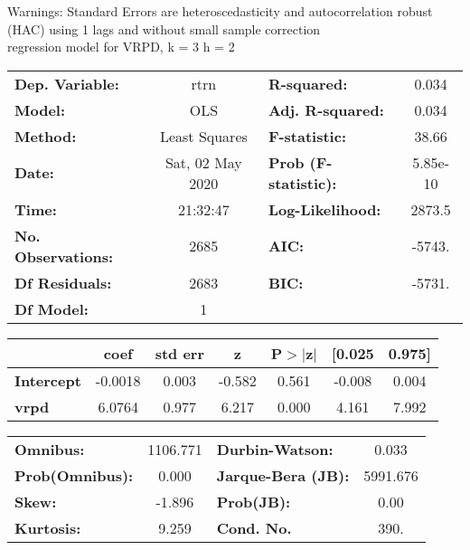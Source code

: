 Warnings: \newline
 [1] Standard Errors are heteroscedasticity and autocorrelation robust (HAC) using 1 lags and without small sample correction\\ 

regression model for VRPD, k = 3 h = 2\begin{center}
\begin{tabular}{lclc}
\toprule
\textbf{Dep. Variable:}    &       rtrn       & \textbf{  R-squared:         } &     0.034   \\
\textbf{Model:}            &       OLS        & \textbf{  Adj. R-squared:    } &     0.034   \\
\textbf{Method:}           &  Least Squares   & \textbf{  F-statistic:       } &     38.66   \\
\textbf{Date:}             & Sat, 02 May 2020 & \textbf{  Prob (F-statistic):} &  5.85e-10   \\
\textbf{Time:}             &     21:32:47     & \textbf{  Log-Likelihood:    } &    2873.5   \\
\textbf{No. Observations:} &        2685      & \textbf{  AIC:               } &    -5743.   \\
\textbf{Df Residuals:}     &        2683      & \textbf{  BIC:               } &    -5731.   \\
\textbf{Df Model:}         &           1      & \textbf{                     } &             \\
\bottomrule
\end{tabular}
\begin{tabular}{lcccccc}
                   & \textbf{coef} & \textbf{std err} & \textbf{z} & \textbf{P$> |$z$|$} & \textbf{[0.025} & \textbf{0.975]}  \\
\midrule
\textbf{Intercept} &      -0.0018  &        0.003     &    -0.582  &         0.561        &       -0.008    &        0.004     \\
\textbf{vrpd}      &       6.0764  &        0.977     &     6.217  &         0.000        &        4.161    &        7.992     \\
\bottomrule
\end{tabular}
\begin{tabular}{lclc}
\textbf{Omnibus:}       & 1106.771 & \textbf{  Durbin-Watson:     } &    0.033  \\
\textbf{Prob(Omnibus):} &   0.000  & \textbf{  Jarque-Bera (JB):  } & 5991.676  \\
\textbf{Skew:}          &  -1.896  & \textbf{  Prob(JB):          } &     0.00  \\
\textbf{Kurtosis:}      &   9.259  & \textbf{  Cond. No.          } &     390.  \\
\bottomrule
\end{tabular}
\end{center}

